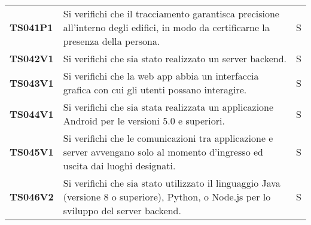 \documentclass[../../piano-di-qualifica.tex]{subfiles}
\begin{document}
\begin{longtable}[H]{>{\centering\bfseries}m{3cm} >{}m{10cm} >{\centering\arraybackslash}m{3cm}}

  TS041P1            & Si verifichi che il tracciamento garantisca precisione all'interno degli edifici, in modo da certificarne la presenza della persona.
                     & S                                                                                                                                                                                                                                                   \\

  TS042V1            & Si verifichi che sia stato realizzato un server backend.
                     & S                                                                                                                                                                                                                                                   \\

  TS043V1            & Si verifichi che la web app abbia un interfaccia grafica con cui gli utenti possano interagire.
                     & S                                                                                                                                                                                                                                                   \\

  TS044V1            & Si verifichi che sia stata realizzata un applicazione Android per le versioni 5.0 e superiori.
                     & S                                                                                                                                                                                                                                                   \\

  TS045V1            & Si verifichi che le comunicazioni tra applicazione e server avvengano solo al momento d'ingresso ed uscita dai luoghi designati.
                     & S                                                                                                                                                                                                                                                  \\

  TS046V2            & Si verifichi che sia stato utilizzato il linguaggio Java (versione 8 o superiore), Python, o Node.js per lo sviluppo del server backend.
                     & S                                                                                                                                                                                                                                                   \\


\end{longtable}
\end{document}
